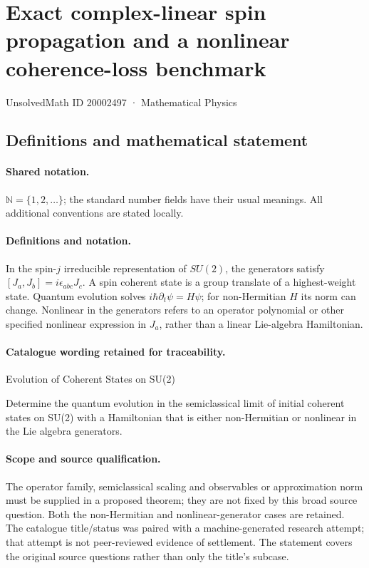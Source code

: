 \documentclass[11pt]{article}
\begin{document}
\setcounter{section}{20002496}
\section{Exact complex-linear spin propagation and a nonlinear coherence-loss benchmark}\label{20002497}
{\small UnsolvedMath ID 20002497 · Mathematical Physics}
\subsection{Definitions and mathematical statement}

\paragraph{Shared notation.}$\mathbb N=\{1,2,\ldots\}$; the standard number fields have their usual meanings. All additional conventions are stated locally.


\paragraph{Definitions and notation.}In the spin-$j$ irreducible representation of $SU(2)$, the generators satisfy $[J_a,J_b]=i\epsilon_{abc}J_c$. A spin coherent state is a group translate of a highest-weight state. Quantum evolution solves $i\hbar\partial_t\psi=H\psi$; for non-Hermitian $H$ its norm can change. Nonlinear in the generators refers to an operator polynomial or other specified nonlinear expression in $J_a$, rather than a linear Lie-algebra Hamiltonian.

\paragraph{Catalogue wording retained for traceability.}
Evolution of Coherent States on SU(2)

Determine the quantum evolution in the semiclassical limit of initial coherent states on SU(2) with a Hamiltonian that is either non-Hermitian or nonlinear in the Lie algebra generators.
\paragraph{Scope and source qualification.}The operator family, semiclassical scaling and observables or approximation norm must be supplied in a proposed theorem; they are not fixed by this broad source question. Both the non-Hermitian and nonlinear-generator cases are retained. The catalogue title/status was paired with a machine-generated research attempt; that attempt is not peer-reviewed evidence of settlement. The statement covers the original source questions rather than only the title’s subcase.
\end{document}
